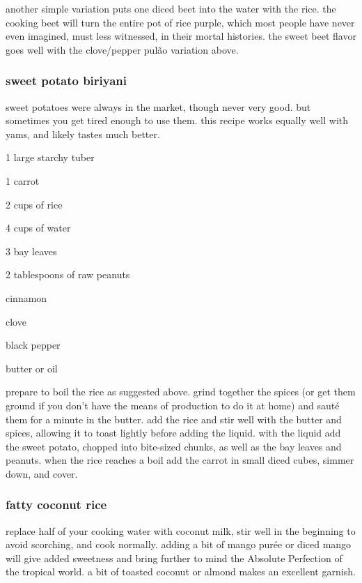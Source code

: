 another simple variation puts one diced beet into the water with the
rice. the cooking beet will turn the entire pot of rice purple, which
most people have never even imagined, must less witnessed, in their
mortal histories. the sweet beet flavor goes well with the
clove/pepper pul\~{a}o variation above.

\subsubsection{sweet potato biriyani}

sweet potatoes were always in the market, though never very good. but
sometimes you get tired enough to use them. this recipe works equally
well with yams, and likely tastes much better.

\begin{ingredients}
  \item 1 large starchy tuber
  \item 1 carrot
  \item 2 cups of rice
  \item 4 cups of water
  \item 3 bay leaves
  \item 2 tablespoons of raw peanuts
  \item cinnamon
  \item clove
  \item black pepper
  \item butter or oil
\end{ingredients}

prepare to boil the rice as suggested above. grind together the spices
(or get them ground if you don't have the means of production to do it
at home) and saut\'{e} them for a minute in the butter. add the rice
and stir well with the butter and spices, allowing it to toast lightly
before adding the liquid. with the liquid add the sweet potato,
chopped into bite-sized chunks, as well as the bay leaves and
peanuts. when the rice reaches a boil add the carrot in small diced
cubes, simmer down, and cover.

\subsubsection{fatty coconut rice}

replace half of your cooking water with coconut milk, stir well in the
beginning to avoid scorching, and cook normally. adding a bit of mango
pur\'{e}e or diced mango will give added sweetness and bring further
to mind the Absolute Perfection of the tropical world. a bit of
toasted coconut or almond makes an excellent garnish.

